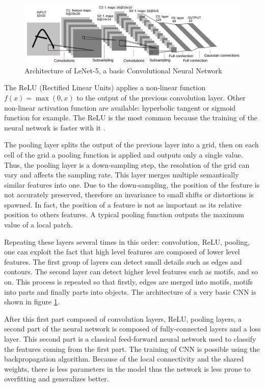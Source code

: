 \begin{figure}
	\includegraphics[width=\textwidth]{img/cnn.png}
	\caption{Architecture of LeNet-5, a basic Convolutional Neural Network}
	\label{fig:cnn}
\end{figure}

The ReLU (Rectified Linear Units) applies a non-linear function $f(x) = \max(0, x)$ to the output of the previous convolution layer. Other non-linear activation function are available: hyperbolic tangent or sigmoid function for example. The ReLU is the most common because the training of the neural network is faster with it \cite{krizhevsky2012imagenet}.

The pooling layer splits the output of the previous layer into a grid, then on each cell of the grid a pooling function is applied and outputs only a single value. Thus, the pooling layer is a down-sampling step, the resolution of the grid can vary and affects the sampling rate. This layer merges multiple semantically similar features into one. Due to the down-sampling, the position of the feature is not accurately preserved, therefore an invariance to small shifts or distortions is spawned. In fact, the position of a feature is not as important as its relative position to others features. A typical pooling function outputs the maximum value of a local patch.

Repeating these layers several times in this order: convolution, ReLU, pooling, one can exploit the fact that high level features are composed of lower level features. The first group of layers can detect small details such as edges and contours. The second layer can detect higher level features such as motifs, and so on. This process is repeated so that firstly, edges are merged into motifs, motifs into parts and finally parts into objects. The architecture of a very basic CNN is shown in figure \ref{fig:cnn}.

After this first part composed of convolution layers, ReLU, pooling layers, a second part of the neural network is composed of fully-connected layers and a loss layer. This second part is a classical feed-forward neural network used to classify the features coming from the first part. The training of CNN is possible using the backpropagation algorithm. Because of the local connectivity and the shared weights, there is less parameters in the model thus the network is less prone to overfitting and generalizes better.

